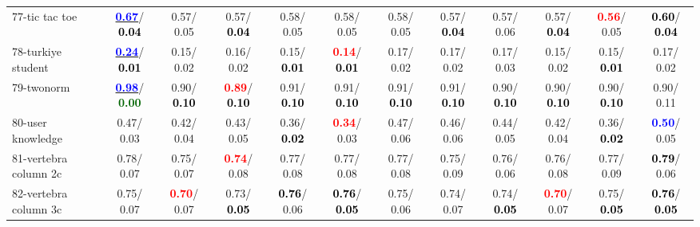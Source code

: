 \begin{table}[h]
\begin{center}
{\begin{tabular}{lc|c|c|c|c|c|c|c|c|c|c}
77-tic tac toe & \underline{\textcolor{blue}{\textbf{  0.67}}}/\textcolor{black}{\textbf{  0.04}} &   0.57/  0.05 &   0.57/\textcolor{black}{\textbf{  0.04}} &   0.58/  0.05 &   0.58/  0.05 &   0.58/  0.05 &   0.57/\textcolor{black}{\textbf{  0.04}} &   0.57/  0.06 &   0.57/\textcolor{black}{\textbf{  0.04}} & \textcolor{red}{\textbf{  0.56}}/  0.05 & \textcolor{black}{\textbf{  0.60}}/\textcolor{black}{\textbf{  0.04}} \\
78-turkiye student & \underline{\textcolor{blue}{\textbf{  0.24}}}/\textcolor{black}{\textbf{  0.01}} &   0.15/  0.02 &   0.16/  0.02 &   0.15/\textcolor{black}{\textbf{  0.01}} & \textcolor{red}{\textbf{  0.14}}/\textcolor{black}{\textbf{  0.01}} &   0.17/  0.02 &   0.17/  0.02 &   0.17/  0.03 &   0.15/  0.02 &   0.15/\textcolor{black}{\textbf{  0.01}} &   0.17/  0.02 \\ \hline
79-twonorm & \underline{\textcolor{blue}{\textbf{  0.98}}}/\textcolor{darkgreen}{\textbf{  0.00}} &   0.90/\textcolor{black}{\textbf{  0.10}} & \textcolor{red}{\textbf{  0.89}}/\textcolor{black}{\textbf{  0.10}} &   0.91/\textcolor{black}{\textbf{  0.10}} &   0.91/\textcolor{black}{\textbf{  0.10}} &   0.91/\textcolor{black}{\textbf{  0.10}} &   0.91/\textcolor{black}{\textbf{  0.10}} &   0.90/\textcolor{black}{\textbf{  0.10}} &   0.90/\textcolor{black}{\textbf{  0.10}} &   0.90/\textcolor{black}{\textbf{  0.10}} &   0.90/  0.11 \\
80-user knowledge &   0.47/  0.03 &   0.42/  0.04 &   0.43/  0.05 &   0.36/\textcolor{black}{\textbf{  0.02}} & \textcolor{red}{\textbf{  0.34}}/  0.03 &   0.47/  0.06 &   0.46/  0.06 &   0.44/  0.05 &   0.42/  0.04 &   0.36/\textcolor{black}{\textbf{  0.02}} & \textcolor{blue}{\textbf{  0.50}}/  0.05 \\
81-vertebra column 2c &   0.78/  0.07 &   0.75/  0.07 & \textcolor{red}{\textbf{  0.74}}/  0.08 &   0.77/  0.08 &   0.77/  0.08 &   0.77/  0.08 &   0.75/  0.09 &   0.76/  0.06 &   0.76/  0.08 &   0.77/  0.09 & \textcolor{black}{\textbf{  0.79}}/  0.06 \\
82-vertebra column 3c &   0.75/  0.07 & \textcolor{red}{\textbf{  0.70}}/  0.07 &   0.73/\textcolor{black}{\textbf{  0.05}} & \textcolor{black}{\textbf{  0.76}}/  0.06 & \textcolor{black}{\textbf{  0.76}}/\textcolor{black}{\textbf{  0.05}} &   0.75/  0.06 &   0.74/  0.07 &   0.74/\textcolor{black}{\textbf{  0.05}} & \textcolor{red}{\textbf{  0.70}}/  0.07 &   0.75/\textcolor{black}{\textbf{  0.05}} & \textcolor{black}{\textbf{  0.76}}/\textcolor{black}{\textbf{  0.05}} \\

\end{tabular}}
\end{center}
\end{table}

